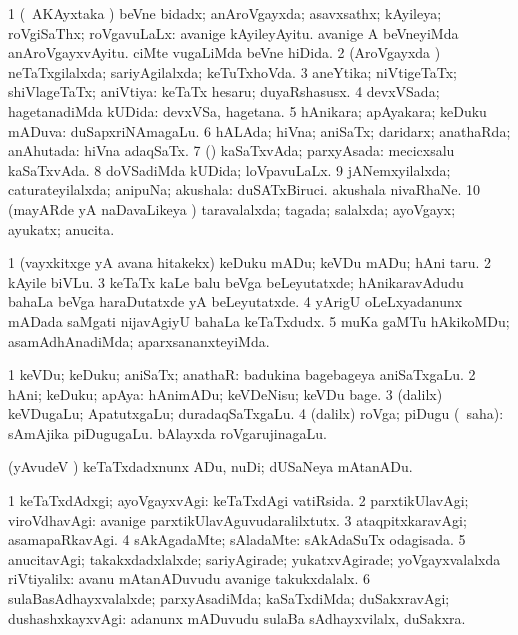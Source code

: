 \bentry
{}
\gl{\gu}
\bmng
\bnum
\num{1} (\sA\ AKAyxtaka \parx) beVne bidadx; anAroVgayxda; asavxsathx; kAyileya; roVgiSaThx; roVgavuLaLx:  avanige kAyileyAyitu.  avanige A beVneyiMda anAroVgayxvAyitu.  ciMte \mo vugaLiMda beVne hiDida. 
\num{2} (AroVgayxda \vi) neTaTxgilalxda; sariyAgilalxda; keTuTxhoVda. 
\num{3} aneYtika; niVtigeTaTx; shiVlageTaTx; aniVtiya:  keTaTx hesaru; duyaRshasusx. 
\num{4} devxVSada; hagetanadiMda kUDida:  devxVSa, hagetana. 
\num{5} hAnikara; apAyakara; keDuku mADuva:  duSapxriNAmagaLu. 
\num{6} hALAda; hiVna; aniSaTx; daridarx; anathaRda; anAhutada:  hiVna adaqSaTx. 
\num{7} (\pArxparx) kaSaTxvAda; parxyAsada:  mecicxsalu kaSaTxvAda. 
\num{8} doVSadiMda kUDida; loVpavuLaLx. 
\num{9} jANemxyilalxda; caturateyilalxda; anipuNa; akushala:  duSATxBiruci.  akushala nivaRhaNe. 
\num{10} (mayARde yA naDavaLikeya \vi) taravalalxda; tagada; salalxda; ayoVgayx; ayukatx; anucita. 
\enum
\emng

\noindent
\gl{\nuga}
\bmng
\bnum
\num{1}  (vayxkitxge yA avana hitakekx) keDuku mADu; keVDu mADu; hAni taru. 
\num{2}   kAyile biVLu. 
\num{3}  keTaTx kaLe balu beVga beLeyutatxde; hAnikaravAdudu bahaLa beVga haraDutatxde yA beLeyutatxde. 
\num{4}  yArigU oLeLxyadanunx mADada saMgati nijavAgiyU bahaLa keTaTxdudx. 
\num{5}  muKa gaMTu hAkikoMDu; asamAdhAnadiMda; aparxsananxteyiMda. 
\enum
\emng
\eentry

\bentry
{}
\gl{\nA}
\bmng
\bnum
\num{1} keVDu; keDuku; aniSaTx; anathaR:  badukina bagebageya aniSaTxgaLu. 
\num{2} hAni; keDuku; apAya:  hAnimADu; keVDeNisu; keVDu bage. 
\num{3} (\bava dalilx) keVDugaLu; ApatutxgaLu; duradaqSaTxgaLu. 
\num{4} (\bava dalilx) roVga; piDugu (\rUpa\ saha):  sAmAjika piDugugaLu.  bAlayxda roVgarujinagaLu. 
\enum
\emng

\noindent
\gl{\nuga}
\bmng
{} (yAvudeV \vi) keTaTxdadxnunx ADu, nuDi; dUSaNeya mAtanADu. 
\emng
\eentry

\bentry
{}
\gl{\kirxvi}
\bmng
\bnum
\num{1} keTaTxdAdxgi; ayoVgayxvAgi:  keTaTxdAgi vatiRsida. 
\num{2} parxtikUlavAgi; viroVdhavAgi:  avanige parxtikUlavAguvudaralilxtutx. 
\num{3} ataqpitxkaravAgi; asamapaRkavAgi. 
\num{4} sAkAgadaMte; sAladaMte:  sAkAdaSuTx odagisada. 
\num{5} anucitavAgi; takakxdadxlalxde; sariyAgirade; yukatxvAgirade; yoVgayxvalalxda riVtiyalilx:  avanu mAtanADuvudu avanige takukxdalalx. 
\num{6} sulaBasAdhayxvalalxde; parxyAsadiMda; kaSaTxdiMda; duSakxravAgi; dushashxkayxvAgi:  adanunx mADuvudu sulaBa sAdhayxvilalx, duSakxra. 
\enum
\emng

